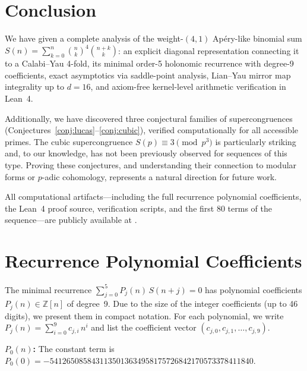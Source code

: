 \documentclass[11pt, a4paper]{article}
\begin{document}
\section{Conclusion}\label{sec:conclusion}

We have given a complete analysis of the weight-$(4,1)$ Ap\'ery-like binomial sum $S(n) = \sum_{k=0}^n \binom{n}{k}^4 \binom{n+k}{k}$: an explicit diagonal representation connecting it to a Calabi--Yau 4-fold, its minimal order-5 holonomic recurrence with degree-9 coefficients, exact asymptotics via saddle-point analysis, Lian--Yau mirror map integrality up to $d=16$, and axiom-free kernel-level arithmetic verification in Lean~4.

Additionally, we have discovered three conjectural families of supercongruences (Conjectures~\ref{conj:lucas}--\ref{conj:cubic}), verified computationally for all accessible primes. The cubic supercongruence $S(p) \equiv 3 \pmod{p^3}$ is particularly striking and, to our knowledge, has not been previously observed for sequences of this type. Proving these conjectures, and understanding their connection to modular forms or $p$-adic cohomology, represents a natural direction for future work.

All computational artifacts---including the full recurrence polynomial coefficients, the Lean~4 proof source, verification scripts, and the first 80 terms of the sequence---are publicly available at \cite{repo}.


\appendix
\section{Recurrence Polynomial Coefficients}\label{app:recurrence}

The minimal recurrence $\sum_{j=0}^5 P_j(n)\,S(n+j) = 0$ has polynomial coefficients $P_j(n) \in \mathbb{Z}[n]$ of degree~9. Due to the size of the integer coefficients (up to 46 digits), we present them in compact notation. For each polynomial, we write $P_j(n) = \sum_{i=0}^9 c_{j,i}\, n^i$ and list the coefficient vector $(c_{j,0}, c_{j,1}, \dots, c_{j,9})$.

\medskip
\noindent\textbf{$P_0(n)$:} The constant term is $P_0(0) = -5412650858431135013634958175726842170573378411840$.
\end{document}

